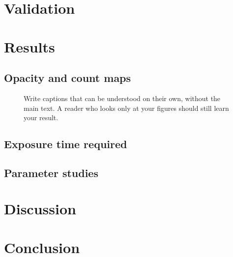\documentclass[11pt,a4paper]{article}
\begin{document}
\section{Validation}

\section{Results}

\subsection{Opacity and count maps}
\begin{figure}[htbp]
    \centering
    \caption{Write captions that can be understood on their own, without the
             main text. A reader who looks only at your figures should still
             learn your result.}
    \label{fig:maps}
\end{figure}

\subsection{Exposure time required}

\subsection{Parameter studies}

\section{Discussion}

\section{Conclusion}
\end{document}
